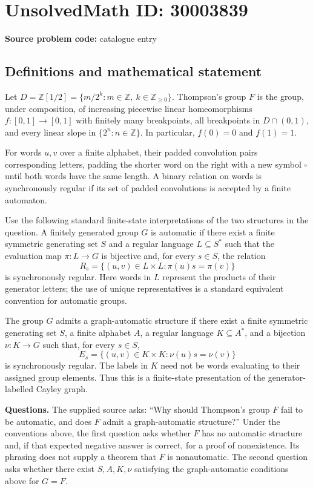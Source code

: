 \documentclass[11pt]{article}
\newcommand{\Z}{\mathbb{Z}}
\begin{document}
\section*{UnsolvedMath ID: 30003839}
\textbf{Source problem code:} catalogue entry
\subsection{Definitions and mathematical statement}
Let \(D=\Z[1/2]=\{m/2^k:m\in\Z,\ k\in\Z_{\geq 0}\}\). Thompson's group \(F\) is the group, under composition, of increasing piecewise linear homeomorphisms \(f:[0,1]\to[0,1]\) with finitely many breakpoints, all breakpoints in \(D\cap(0,1)\), and every linear slope in \(\{2^n:n\in\Z\}\). In particular, \(f(0)=0\) and \(f(1)=1\).

For words \(u,v\) over a finite alphabet, their padded convolution pairs corresponding letters, padding the shorter word on the right with a new symbol \(\square\) until both words have the same length. A binary relation on words is synchronously regular if its set of padded convolutions is accepted by a finite automaton.

Use the following standard finite-state interpretations of the two structures in the question. A finitely generated group \(G\) is automatic if there exist a finite symmetric generating set \(S\) and a regular language \(L\subseteq S^*\) such that the evaluation map \(\pi:L\to G\) is bijective and, for every \(s\in S\), the relation
\[
R_s=\{(u,v)\in L\times L:\pi(u)s=\pi(v)\}
\]
is synchronously regular. Here words in \(L\) represent the products of their generator letters; the use of unique representatives is a standard equivalent convention for automatic groups.

The group \(G\) admits a graph-automatic structure if there exist a finite symmetric generating set \(S\), a finite alphabet \(A\), a regular language \(K\subseteq A^*\), and a bijection \(\nu:K\to G\) such that, for every \(s\in S\),
\[
E_s=\{(u,v)\in K\times K:\nu(u)s=\nu(v)\}
\]
is synchronously regular. The labels in \(K\) need not be words evaluating to their assigned group elements. Thus this is a finite-state presentation of the generator-labelled Cayley graph.

\textbf{Questions.} The supplied source asks: ``Why should Thompson's group \(F\) fail to be automatic, and does \(F\) admit a graph-automatic structure?'' Under the conventions above, the first question asks whether \(F\) has no automatic structure and, if that expected negative answer is correct, for a proof of nonexistence. Its phrasing does not supply a theorem that \(F\) is nonautomatic. The second question asks whether there exist \(S,A,K,\nu\) satisfying the graph-automatic conditions above for \(G=F\).
\end{document}
